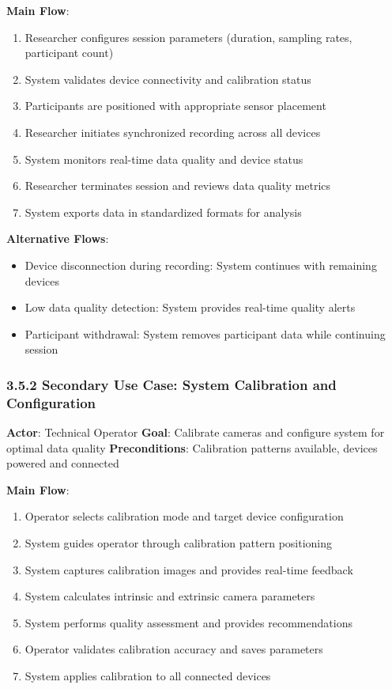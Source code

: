 \documentclass[12pt,a4paper]{article}
\begin{document}
\textbf{Main Flow}:

\begin{enumerate}
\item Researcher configures session parameters (duration, sampling rates, participant count)
\item System validates device connectivity and calibration status
\item Participants are positioned with appropriate sensor placement
\item Researcher initiates synchronized recording across all devices
\item System monitors real-time data quality and device status
\item Researcher terminates session and reviews data quality metrics
\item System exports data in standardized formats for analysis

\end{enumerate}
\textbf{Alternative Flows}:

\begin{itemize}
\item Device disconnection during recording: System continues with remaining devices
\item Low data quality detection: System provides real-time quality alerts
\item Participant withdrawal: System removes participant data while continuing session

\end{itemize}
\subsubsection{3.5.2 Secondary Use Case: System Calibration and Configuration}

\textbf{Actor}: Technical Operator  
\textbf{Goal}: Calibrate cameras and configure system for optimal data quality  
\textbf{Preconditions}: Calibration patterns available, devices powered and connected

\textbf{Main Flow}:

\begin{enumerate}
\item Operator selects calibration mode and target device configuration
\item System guides operator through calibration pattern positioning
\item System captures calibration images and provides real-time feedback
\item System calculates intrinsic and extrinsic camera parameters
\item System performs quality assessment and provides recommendations
\item Operator validates calibration accuracy and saves parameters
\item System applies calibration to all connected devices

\end{enumerate}
\end{document}
